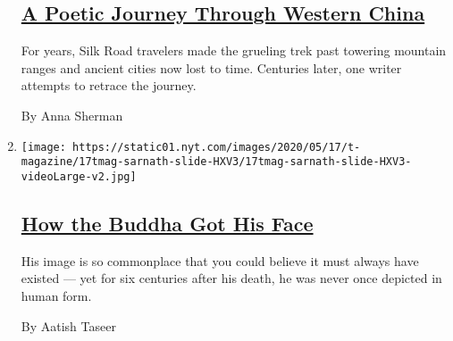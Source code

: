 \begin{enumerate}
  \hypertarget{a-poetic-journey-through-western-china}{%
  \subsection{\texorpdfstring{\href{/2020/05/11/t-magazine/china-desert.html}{A
  Poetic Journey Through Western
  China}}{A Poetic Journey Through Western China}}\label{a-poetic-journey-through-western-china}}

  For years, Silk Road travelers made the grueling trek past towering
  mountain ranges and ancient cities now lost to time. Centuries later,
  one writer attempts to retrace the journey.

  By Anna Sherman
\item
  \texttt{[image: https://static01.nyt.com/images/2020/05/17/t-magazine/17tmag-sarnath-slide-HXV3/17tmag-sarnath-slide-HXV3-videoLarge-v2.jpg]}

  \hypertarget{how-the-buddha-got-his-face}{%
  \subsection{\texorpdfstring{\href{/2020/05/11/t-magazine/buddha-statues-face.html}{How
  the Buddha Got His
  Face}}{How the Buddha Got His Face}}\label{how-the-buddha-got-his-face}}

  His image is so commonplace that you could believe it must always have
  existed --- yet for six centuries after his death, he was never once
  depicted in human form.

  By Aatish Taseer
\end{enumerate}

